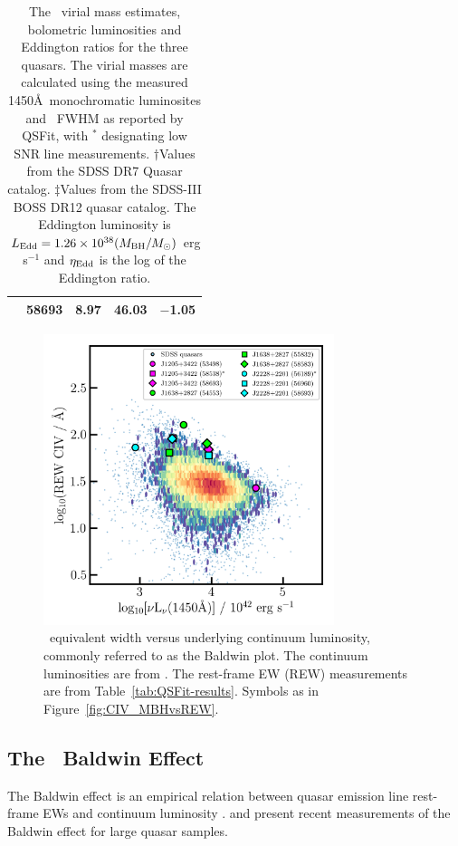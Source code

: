 \documentclass[fleqn,usenatbib]{mnras}
\begin{document}
\begin{table}
\begin{tabular}{l c cc l}
                                              & 58693          &  8.97                      & 46.03                         &  $-$1.05 \\
    \hline
    \hline
  \end{tabular}
  \caption{The \civ\ virial mass estimates, bolometric luminosities and Eddington ratios for the
    three quasars.
    The virial masses are calculated using the measured 1450\AA\ monochromatic luminosites and \civ\ FWHM
    as reported by QSFit, with $^{*}$ designating low SNR line measurements.
        $\dagger$Values from the \citet{Shen2011} SDSS DR7 Quasar catalog.
    $\ddagger$Values from the \citet{Kozlowski2017} SDSS-III BOSS DR12 quasar catalog.
    The Eddington luminosity is 
    $L_{\rm Edd} = 1.26\times10^{38} (M_{\rm BH}/M_{\odot})$ erg s$^{-1}$
    and $\eta_{\rm Edd}$ is the log of the Eddington ratio.}
\label{tab:Eddington_ratios} 
\end{table}


\begin{figure}
  \centering
  \includegraphics[width=8.5cm, trim=0.2cm 0.2cm 0.0cm 0.2cm, clip]{figures/CIV_CLQs_Baldwin_20200519.png}
   \vspace{-12pt}
   \caption[]{\civ\ equivalent width versus underlying continuum luminosity,
     commonly referred to as the Baldwin plot.  The continuum luminosities
     are from \citet{Calderone2017}.  The rest-frame EW (REW) measurements
     are from Table~\ref{tab:QSFit-results}.  Symbols as in
     Figure~\ref{fig:CIV_MBHvsREW}.
   }
  \label{fig:CIV_Baldwin}
\end{figure}

\subsection{The \civ\ Baldwin Effect}
The Baldwin effect \citep{Baldwin1977} is an empirical relation
between quasar emission line rest-frame EWs and continuum luminosity
\citep[e.g.,][]{Shields2007, Hamann2017, Calderone2017}.
\citet{Hamann2017} and \citet{Calderone2017} present recent
measurements of the Baldwin effect for large quasar samples.
\end{document}
